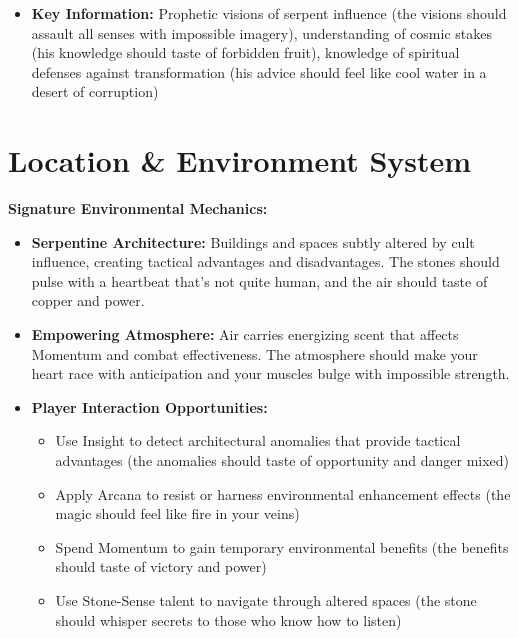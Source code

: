 \documentclass[11pt]{article}
\begin{document}
\begin{itemize}
\begin{itemize}
  \item \textbf{Key Information:} Prophetic visions of serpent influence (the visions should assault all senses with impossible imagery), understanding of cosmic stakes (his knowledge should taste of forbidden fruit), knowledge of spiritual defenses against transformation (his advice should feel like cool water in a desert of corruption)
  \end{itemize}
\end{itemize}

\section{Location \& Environment System}

\textbf{Signature Environmental Mechanics:}
\begin{itemize}
\item \textbf{Serpentine Architecture:} Buildings and spaces subtly altered by cult influence, creating tactical advantages and disadvantages. The stones should pulse with a heartbeat that's not quite human, and the air should taste of copper and power.
\item \textbf{Empowering Atmosphere:} Air carries energizing scent that affects Momentum and combat effectiveness. The atmosphere should make your heart race with anticipation and your muscles bulge with impossible strength.
\item \textbf{Player Interaction Opportunities:}
  \begin{itemize}
  \item Use Insight to detect architectural anomalies that provide tactical advantages (the anomalies should taste of opportunity and danger mixed)
  \item Apply Arcana to resist or harness environmental enhancement effects (the magic should feel like fire in your veins)
  \item Spend Momentum to gain temporary environmental benefits (the benefits should taste of victory and power)
  \item Use Stone-Sense talent to navigate through altered spaces (the stone should whisper secrets to those who know how to listen)
  \end{itemize}
\end{itemize}
\end{document}
